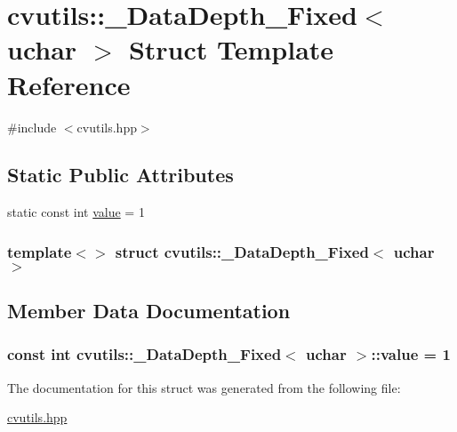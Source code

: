 \hypertarget{structcvutils_1_1___data_depth___fixed_3_01uchar_01_4}{\section{cvutils\-:\-:\-\_\-\-Data\-Depth\-\_\-\-Fixed$<$ uchar $>$ Struct Template Reference}
\label{structcvutils_1_1___data_depth___fixed_3_01uchar_01_4}
}


{\ttfamily \#include $<$cvutils.\-hpp$>$}

\subsection*{Static Public Attributes}
\begin{DoxyCompactItemize}
\item 
static const int \hyperlink{structcvutils_1_1___data_depth___fixed_3_01uchar_01_4_a2148a31b77a8f3b8bf01bb18e770351e}{value} = 1
\end{DoxyCompactItemize}
\subsubsection*{template$<$$>$ struct cvutils\-::\-\_\-\-Data\-Depth\-\_\-\-Fixed$<$ uchar $>$}



\subsection{Member Data Documentation}
\hypertarget{structcvutils_1_1___data_depth___fixed_3_01uchar_01_4_a2148a31b77a8f3b8bf01bb18e770351e}{
\subsubsection[{value}]{\setlength{\rightskip}{0pt plus 5cm}const int {\bf cvutils\-::\-\_\-\-Data\-Depth\-\_\-\-Fixed}$<$ uchar $>$\-::{\bf value} = 1}}\label{structcvutils_1_1___data_depth___fixed_3_01uchar_01_4_a2148a31b77a8f3b8bf01bb18e770351e}


The documentation for this struct was generated from the following file\-:\begin{DoxyCompactItemize}
\item 
\hyperlink{cvutils_8hpp}{cvutils.\-hpp}\end{DoxyCompactItemize}
